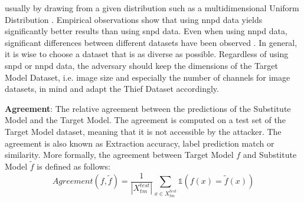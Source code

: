 usually by drawing from a given distribution such as a multidimensional Uniform Distribution \cite{pal2020activethief}. Empirical observations show that using \gls{nnpd} data
yields significantly better results than using \gls{snpd} data. Even when using \gls{nnpd} data, significant differences between different datasets have been observed 
\cite{pal2020activethief}. In general, it is wise to choose a dataset that is as diverse as possible. Regardless of using \gls{snpd} or \gls{nnpd} data, the adversary should keep the
dimensions of the Target Model Dataset, i.e. image size and especially the number of channels for image datasets, in mind and adapt the Thief Dataset accordingly. \par
\textbf{Agreement}: The relative agreement between the predictions of the Substitute Model and the Target Model. The agreement is computed on a test set of the Target 
Model dataset, meaning that it is not accessible by the attacker. The agreement is also known as Extraction accuracy, label prediction match or similarity. More formally,
the agreement between Target Model $f$ and Substitute Model $\tilde{f}$ is defined as follows:
\begin{equation}
    Agreement(f,\tilde{f}) = \frac{1}{|X_{tm}^{test}|} \sum_{x \in X_{tm}^{test}} \mathds{1}(f(x) = \tilde{f}(x))
\end{equation}




